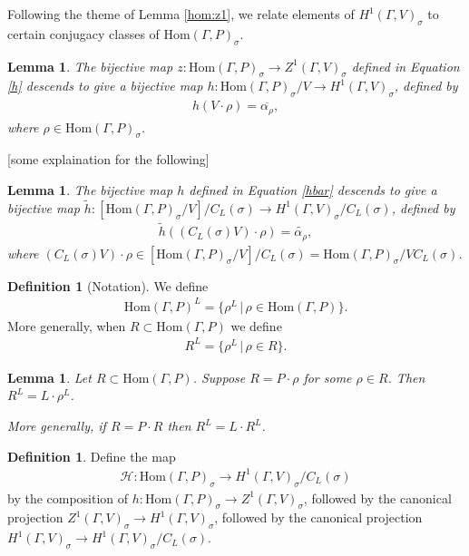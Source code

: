 \documentclass[12pt, a4paper]{amsart}
\numberwithin{equation}{section}
\newtheorem{lem}[equation]{Lemma}
\theoremstyle{definition}
\newtheorem{defn}[equation]{Definition}
\theoremstyle{remark}
\theoremstyle{remark}
\begin{document}
Following the theme of Lemma \ref{hom:z1}, we relate elements of $H^1(\Gamma, V)_\sigma$ to certain conjugacy classes of $\mathrm{Hom}(\Gamma, P)_\sigma$.

\begin{lem} \label{hom:h1}
The bijective map $z: \mathrm{Hom}(\Gamma, P)_\sigma \rightarrow Z^1(\Gamma, V)_\sigma$ defined in Equation \ref{h} descends to give a bijective map $h:\mathrm{Hom}(\Gamma, P)_\sigma/V \rightarrow H^1(\Gamma, V)_\sigma$, defined by
\begin{eqnarray} \label{h}
h(V \cdot \rho) = \overline{\alpha_\rho},
\end{eqnarray}
where $\rho \in \mathrm{Hom}(\Gamma, P)_\sigma$.
\end{lem}

[some explaination for the following]

\begin{lem} \label{hom:h1clv}
The bijective map $h$ defined in Equation \ref{hbar} descends to give a bijective map $\widetilde{h}:\left[\mathrm{Hom}(\Gamma, P)_\sigma/V\right]/C_L(\sigma) \rightarrow H^1(\Gamma, V)_\sigma/C_L(\sigma)$, defined by
\begin{eqnarray}
\widetilde{h}((C_L(\sigma)V) \cdot \rho) = \widetilde{\alpha_\rho},
\end{eqnarray}
where $(C_L(\sigma)V)\cdot \rho \in \left[\mathrm{Hom}(\Gamma, P)_\sigma / V\right]/C_L(\sigma) = \mathrm{Hom}(\Gamma, P)_\sigma/VC_L(\sigma)$.
\end{lem}


\begin{defn}[Notation] We define
\begin{eqnarray} \mathrm{Hom}(\Gamma, P)^L = \{ \rho^L \,|\, \rho \in \mathrm{Hom}(\Gamma, P)\}. \end{eqnarray}
More generally, when $R \subset \mathrm{Hom}(\Gamma, P)$ we define
\begin{eqnarray} R^L = \{\rho^L \,|\, \rho \in R\}. \end{eqnarray}
\end{defn}

\begin{lem} \label{lem:prlrl} Let $R \subset \mathrm{Hom}(\Gamma, P)$. Suppose $R = P \cdot \rho$ for some $\rho \in R$. Then $R^L = L \cdot \rho^L$.

More generally, if $R = P \cdot R$ then $R^L = L \cdot R^L$.
\end{lem}

\begin{defn} Define the map
\begin{eqnarray} \mathcal{H}:\mathrm{Hom}(\Gamma, P)_\sigma \rightarrow H^1(\Gamma, V)_\sigma / C_L(\sigma) \end{eqnarray}
by the composition of $h:\mathrm{Hom}(\Gamma, P)_\sigma \rightarrow Z^1(\Gamma, V)_\sigma$, followed by the canonical projection $Z^1(\Gamma, V)_\sigma \rightarrow H^1(\Gamma, V)_\sigma$, followed by the canonical projection $H^1(\Gamma, V)_\sigma \rightarrow H^1(\Gamma, V)_\sigma/C_L(\sigma)$.
\end{defn}
\end{document}
